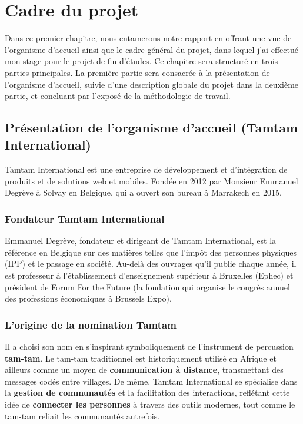 \chapter{Cadre du projet}
Dans ce premier chapitre, nous entamerons notre rapport en offrant une vue de l'organisme
d'accueil ainsi que le cadre général du projet, dans lequel j'ai effectué mon stage pour le projet
de fin d'études.
Ce chapitre sera structuré en trois parties
principales. La première partie sera consacrée à la présentation de l'organisme d'accueil, suivie
d'une description globale du projet dans la deuxième partie, et concluant par l'exposé de la
méthodologie de travail.

\section{Présentation de l'organisme d'accueil (Tamtam International)}

Tamtam International est une entreprise de développement et d'intégration de produits et de
solutions web et mobiles. Fondée en 2012 par Monsieur Emmanuel Degrève à Solvay en
Belgique, qui a ouvert son bureau à Marrakech en 2015.

\subsection{Fondateur Tamtam International}
Emmanuel Degrève, fondateur et dirigeant de Tamtam International, est la référence en Belgique
sur des matières telles que l'impôt des personnes physiques (IPP) et le passage en société.
Au-delà des ouvrages qu'il publie chaque année, il est professeur à l'établissement d'enseignement
supérieur à Bruxelles (Ephec) et président de Forum For the Future (la fondation qui organise
le congrès annuel des professions économiques à Brussels Expo).

\subsection{L'origine de la nomination Tamtam}
Il a choisi son nom en s'inspirant symboliquement de l'instrument de percussion \textbf{tam-tam}.
Le tam-tam traditionnel est historiquement utilisé en Afrique et ailleurs comme un moyen de
\textbf{communication à distance}, transmettant des messages codés entre villages.
De même, Tamtam International se spécialise dans la \textbf{gestion de communautés} et la
facilitation des interactions, reflétant cette idée de \textbf{connecter les personnes} à travers
des outils modernes, tout comme le tam-tam reliait les communautés autrefois.

